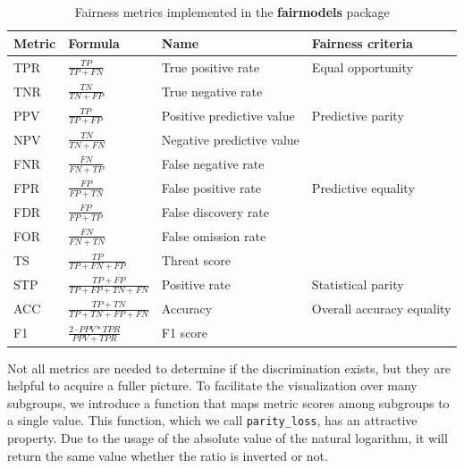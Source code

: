 \begin{table}[h!]
\begin{center}
\footnotesize
    \begin{tabular}{p{1cm}p{2.6cm}p{3.8cm}p{4cm}}
    \hline
Metric & Formula & Name & Fairness criteria \\ \hline    
TPR & $\frac{TP}{TP + FN}$ & True positive rate & Equal opportunity \newline\citep{NIPS20166374} \\ \hline
TNR & $\frac{TN}{TN + FP}$ & True negative rate & \\ \hline
PPV & $\frac{TP}{TP + FP}$ & Positive predictive value & Predictive parity \newline\citep{ppv}\\ \hline
NPV & $\frac{TN}{TN + FN}$ & Negative predictive value & \\ \hline
FNR & $\frac{FN}{FN + TP}$ & False negative rate & \\ \hline
FPR & $\frac{FP}{FP + TN}$ & False positive rate & Predictive equality \newline\citep{ppe} \\ \hline
FDR & $\frac{FP}{FP + TP}$ & False discovery rate &\\ \hline
FOR & $\frac{FN}{FN + TN}$ & False omission rate & \\ \hline
TS & $\frac{TP}{TP + FN + FP}$  & Threat score &\\ \hline
STP & $\frac{TP + FP}{TP + FP + TN + FN}$ & Positive rate & Statistical parity \newline \citep{statisticalparity}\\ \hline
ACC & $\frac{TP + TN}{TP + TN + FP + FN}$ & Accuracy & Overall accuracy equality \newline\citep{accuracy} \\ \hline
F1 &  $\frac{2 \cdot PPV * TPR}{PPV + TPR}$ & F1 score &\\ \hline
    \end{tabular}
    \caption{Fairness metrics implemented in the \textbf{fairmodels} package}
\label{tab:Metrics-table}
\end{center}
\end{table}

Not all metrics are needed to determine if the discrimination exists,
but they are helpful to acquire a fuller picture. To facilitate the
visualization over many subgroups, we introduce a function that maps
metric scores among subgroups to a single value. This function, which we
call \texttt{parity\_loss}, has an attractive property. Due to the usage
of the absolute value of the natural logarithm, it will return the same
value whether the ratio is inverted or not.

